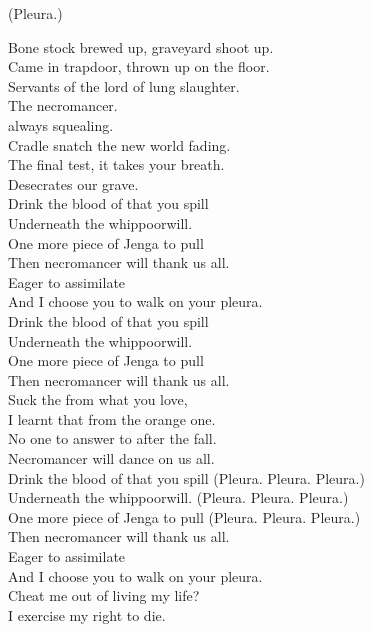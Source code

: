 
(Pleura.)

Bone stock brewed up, graveyard shoot up. \\
Came in trapdoor, thrown up on the floor. \\
Servants of the lord of lung slaughter. \\
The necromancer. \\

 always squealing. \\
Cradle snatch the new world fading. \\
The final test, it takes your breath. \\
Desecrates our grave. \\

Drink the blood of that you spill \\
Underneath the whippoorwill. \\
One more piece of Jenga to pull \\
Then necromancer will thank us all. \\

Eager to assimilate \\
And I choose you to walk on your pleura. \\

Drink the blood of that you spill \\
Underneath the whippoorwill. \\
One more piece of Jenga to pull \\
Then necromancer will thank us all. \\

Suck the  from what you love, \\
I learnt that from the orange one. \\
No one to answer to after the fall. \\
Necromancer will dance on us all. \\

Drink the blood of that you spill (Pleura. Pleura. Pleura.) \\
Underneath the whippoorwill. (Pleura. Pleura. Pleura.) \\
One more piece of Jenga to pull (Pleura. Pleura. Pleura.) \\
Then necromancer will thank us all. \\

Eager to assimilate \\
And I choose you to walk on your pleura. \\
Cheat me out of living my life? \\
I exercise my right to die. \\

